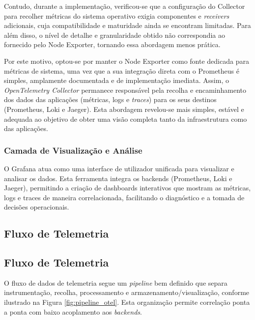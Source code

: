 Contudo, durante a implementação, verificou-se que a configuração do Collector para recolher métricas do sistema operativo exigia componentes e \textit{receivers} adicionais, cuja compatibilidade e maturidade ainda se encontram limitadas. Para além disso, o nível de detalhe e granularidade obtido não correspondia ao fornecido pelo Node Exporter, tornando essa abordagem menos prática.

Por este motivo, optou-se por manter o Node Exporter como fonte dedicada para métricas de sistema, uma vez que a sua integração direta com o Prometheus é simples, amplamente documentada e de implementação imediata. Assim, o \textit{OpenTelemetry Collector} permanece responsável pela recolha e encaminhamento dos dados das aplicações (métricas, logs e \textit{traces}) para os seus destinos (Prometheus, Loki e Jaeger). Esta abordagem revelou-se mais simples, estável e adequada ao objetivo de obter uma visão completa tanto da infraestrutura como das aplicações.


\subsubsection{Camada de Visualização e Análise}
O Grafana atua como uma interface de utilizador unificada para visualizar e analisar os dados. Esta ferramenta integra os backends (Prometheus, Loki e Jaeger), permitindo a criação de dashboards interativos que mostram as métricas, logs e traces de maneira correlacionada, facilitando o diagnóstico e a tomada de decisões operacionais.


\subsection{Fluxo de Telemetria}

\subsection{Fluxo de Telemetria}

O fluxo de dados de telemetria segue um \textit{pipeline} bem definido que separa instrumentação, recolha, processamento e armazenamento/visualização, conforme ilustrado na Figura \ref{fig:pipeline_otel}. Esta organização permite correlação ponta a ponta com baixo acoplamento aos \textit{backends}.

